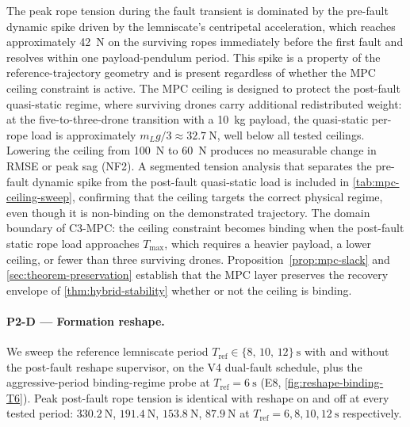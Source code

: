 \begin{remark}
\label{rem:mpc-null}
  The peak rope tension during the fault transient is dominated by the pre-fault dynamic spike driven by the lemniscate's centripetal acceleration, which reaches approximately \SI{42}{\newton} on the surviving ropes immediately before the first fault and resolves within one payload-pendulum period. This spike is a property of the reference-trajectory geometry and is present regardless of whether the MPC ceiling constraint is active. The MPC ceiling is designed to protect the post-fault quasi-static regime, where surviving drones carry additional redistributed weight: at the five-to-three-drone transition with a \SI{10}{\kilo\gram} payload, the quasi-static per-rope load is approximately $m_L g / 3 \approx \SI{32.7}{\newton}$, well below all tested ceilings. Lowering the ceiling from \SI{100}{\newton} to \SI{60}{\newton} produces no measurable change in RMSE or peak sag (NF2). A segmented tension analysis that separates the pre-fault dynamic spike from the post-fault quasi-static load is included in \cref{tab:mpc-ceiling-sweep}, confirming that the ceiling targets the correct physical regime, even though it is non-binding on the demonstrated trajectory. The domain boundary of C3-MPC: the ceiling constraint becomes binding when the post-fault static rope load approaches $T_{\max}$, which requires a heavier payload, a lower ceiling, or fewer than three surviving drones. Proposition~\ref{prop:mpc-slack} and \cref{sec:theorem-preservation} establish that the MPC layer preserves the recovery envelope of \cref{thm:hybrid-stability} whether or not the ceiling is binding.
\end{remark}

\paragraph{P2-D --- Formation reshape.} We sweep the reference lemniscate period $T_{\mathrm{ref}} \in \{8,\,10,\,12\}~\si{\second}$ with and without the post-fault reshape supervisor, on the V4 dual-fault schedule, plus the aggressive-period binding-regime probe at $T_{\mathrm{ref}}=\SI{6}{\second}$ (E8, \cref{fig:reshape-binding-T6}). Peak post-fault rope tension is identical with reshape on and off at every tested period: $\SI{330.2}{\newton}$, $\SI{191.4}{\newton}$, $\SI{153.8}{\newton}$, $\SI{87.9}{\newton}$ at $T_{\mathrm{ref}} = 6, 8, 10, 12~\si{\second}$ respectively.

